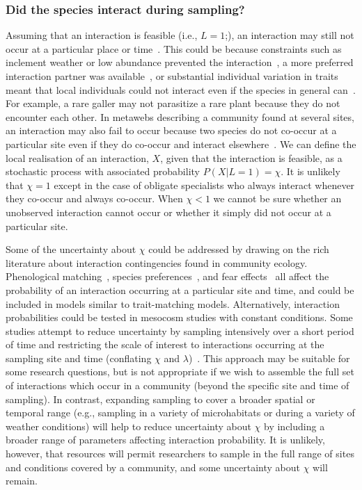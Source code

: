 \documentclass[12pt]{article}
\begin{document}
\begin{spacing}{2.0}
        \subsubsection*{Did the species interact during sampling?} 

          Assuming that an interaction is feasible (i.e., $L=1$;), an interaction may still not occur at a particular place or time~\citep{Poisot2015,Graham2018}. This could be because constraints such as inclement weather or low abundance prevented the interaction~\citep{Jordano2016,Graham2018}, a more preferred interaction partner was available~\citep{Weinstein2017a}, or substantial individual variation in traits meant that local individuals could not interact even if the species in general can~\citep{Gravel2013,Wells2013,Poisot2015}. For example, a rare galler may not parasitize a rare plant because they do not encounter each other. In metawebs describing a community found at several sites, an interaction may also fail to occur because two species do not co-occur at a particular site even if they do co-occur and interact elsewhere~\citep{Graham2018}. We can define the local realisation of an interaction, $X$, given that the interaction is feasible, as a stochastic process with associated probability $P(X|L=1)=\chi$. It is unlikely that $\chi=1$  except in the case of obligate specialists who always interact whenever they co-occur and always co-occur. When $\chi<1$ we cannot be sure whether an unobserved interaction cannot occur or whether it simply did not occur at a particular site.


          Some of the uncertainty about $\chi$ could be addressed by drawing on the rich literature about interaction contingencies found in community ecology. Phenological matching~\citep{MillerRushing2010,Gezon2016}, species preferences~\citep{Pires2011,Novak2015,Coux2016}, and fear effects~\citep{Luttbeg2005,Wirsing2008} all affect the probability of an interaction occurring at a particular site and time, and could be included in models similar to trait-matching models. Alternatively, interaction probabilities could be tested in mesocosm studies with constant conditions. Some studies attempt to reduce uncertainty by sampling intensively over a short period of time and restricting the scale of interest to interactions occurring at the sampling site and time (conflating $\chi$ and $\lambda$)~\citep{Bartomeus2013,Weinstein2017,Weinstein2017a}. This approach may be suitable for some research questions, but is not appropriate if we wish to assemble the full set of interactions which occur in a community (beyond the specific site and time of sampling). In contrast, expanding sampling to cover a broader spatial or temporal range (e.g., sampling in a variety of microhabitats or during a variety of weather conditions) will help to reduce uncertainty about $\chi$ by including a broader range of parameters affecting interaction probability. It is unlikely, however, that resources will permit researchers to sample in the full range of sites and conditions covered by a community, and some uncertainty about $\chi$ will remain.


\end{spacing}
\end{document}
